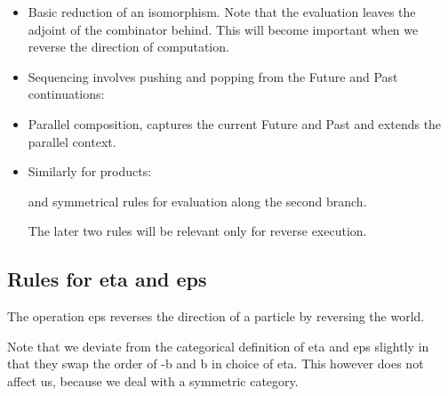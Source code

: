 \documentclass[preprint]{sigplanconf}
\begin{document}
\begin{itemize}
\item 
Basic reduction of an isomorphism. Note that the evaluation leaves the
adjoint of the combinator behind. This will become important when we
reverse the direction of computation.


\item
Sequencing involves pushing and popping from the Future and Past
continuations:


\item
Parallel composition, captures the current Future and Past and extends
the parallel context.


\item
Similarly for products:


and symmetrical rules for evaluation along the second branch. 

The later two rules will be relevant only for reverse execution. 

\end{itemize}


\subsection{Rules for {{eta}} and {{eps}} }

The operation {{eps}} reverses the direction of a particle by
reversing the world. 

Note that we deviate from the categorical definition of {{eta}} and
{{eps}} slightly in that they swap the order of {{-b}} and {{b}} in
choice of {{eta}}. This however does not affect us, because we deal
with a symmetric category.
\end{document}
